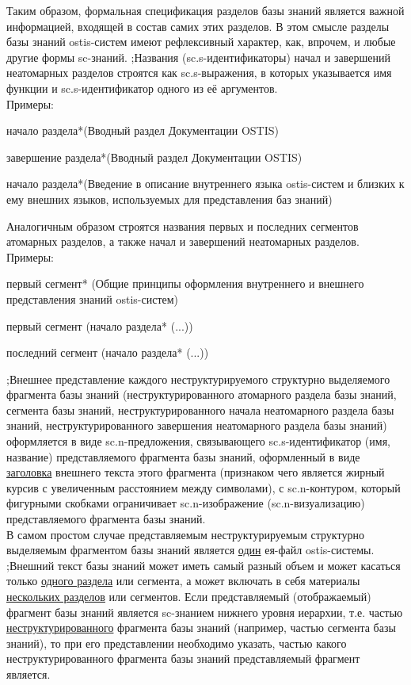 \begin{SCn}
{Таким образом, формальная спецификация разделов базы знаний является важной информацией, входящей в состав самих этих разделов. В этом смысле разделы базы знаний ostis-систем имеют рефлексивный характер, как, впрочем, и любые другие формы sc-знаний.
;Названия (sc.s-идентификаторы) начал и завершений неатомарных разделов строятся как sc.s-выражения, в которых указывается имя функции и sc.s-идентификатор одного из её аргументов.\\
Примеры:
\begin{scnitemize}
    \item начало раздела*(Вводный раздел Документации OSTIS)
    \item завершение раздела*(Вводный раздел Документации OSTIS)
    \item начало раздела*(Введение в описание внутреннего языка ostis-систем и близких к ему внешних языков, используемых для представления баз знаний)
\end{scnitemize}
Аналогичным образом строятся названия первых и последних сегментов атомарных разделов, а также начал и завершений неатомарных разделов.\\
Примеры:
\begin{scnitemize}
    \item первый сегмент* (Общие принципы оформления внутреннего и внешнего представления знаний ostis-систем)
    \item первый сегмент (начало раздела* (...))
    \item последний сегмент (начало раздела* (...))
\end{scnitemize}
;Внешнее представление каждого неструктурируемого структурно выделяемого фрагмента базы знаний (неструктурированного атомарного раздела базы знаний, сегмента базы знаний, неструктурированного начала неатомарного раздела базы знаний, неструктурированного завершения неатомарного раздела базы знаний) оформляется в виде sc.n-предложения, связывающего sc.s-идентификатор (имя, название) представляемого фрагмента базы знаний, оформленный в виде \uline{заголовка} внешнего текста этого фрагмента (признаком чего является жирный курсив с увеличенным расстоянием между символами), с sc.n-контуром, который фигурными скобками ограничивает sc.n-изображение (sc.n-визуализацию) представляемого фрагмента базы знаний.\\
В самом простом случае представляемым неструктурируемым структурно выделяемым фрагментом базы знаний является \uline{один} ея-файл ostis-системы.
;Внешний текст базы знаний может иметь самый разный объем и может касаться только \uline{одного раздела} или сегмента, а может включать в себя материалы \uline{нескольких разделов} или сегментов. Если представляемый (отображаемый) фрагмент базы знаний является sc-знанием нижнего уровня иерархии, т.е. частью \uline{неструктурированного} фрагмента базы знаний (например, частью сегмента базы знаний), то при его представлении необходимо указать, частью какого неструктурированного фрагмента базы знаний представляемый фрагмент является.\\
}
\end{SCn}
